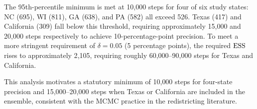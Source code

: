 The 95th-percentile minimum is met at 10{,}000 steps for four of six study states:
NC (695), WI (811), GA (638), and PA (582) all exceed 526.
Texas (417) and California (309) fall below this threshold, requiring
approximately 15{,}000 and 20{,}000 steps respectively to achieve
10-percentage-point precision.
To meet a more stringent requirement of $\delta = 0.05$ (5 percentage
points), the required $\mathrm{ESS}$ rises to approximately 2{,}105, requiring
roughly 60{,}000--90{,}000 steps for Texas and California.

This analysis motivates a statutory minimum of 10{,}000 steps for
four-state precision and 15{,}000--20{,}000 steps when Texas or California
are included in the ensemble, consistent with the MCMC practice in the
redistricting literature.
